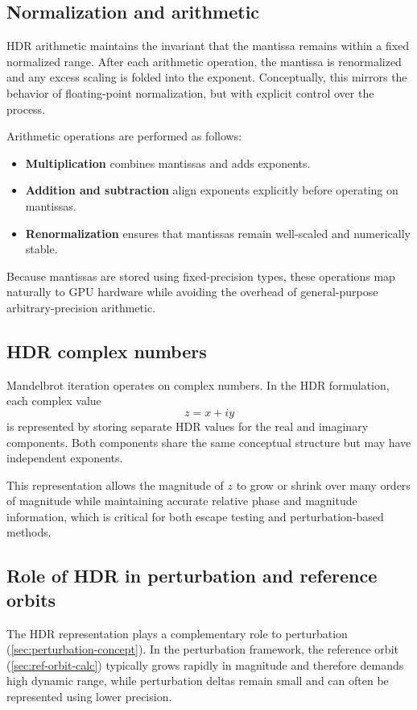 \subsection{Normalization and arithmetic}

HDR arithmetic maintains the invariant that the mantissa remains within a fixed
normalized range. After each arithmetic operation, the mantissa is renormalized
and any excess scaling is folded into the exponent. Conceptually, this mirrors
the behavior of floating-point normalization, but with explicit control over the
process.

Arithmetic operations are performed as follows:
\begin{itemize}
\item \textbf{Multiplication} combines mantissas and adds exponents.
\item \textbf{Addition and subtraction} align exponents explicitly before
      operating on mantissas.
\item \textbf{Renormalization} ensures that mantissas remain well-scaled and
      numerically stable.
\end{itemize}

Because mantissas are stored using fixed-precision types, these operations map
naturally to GPU hardware while avoiding the overhead of general-purpose
arbitrary-precision arithmetic.

\subsection{HDR complex numbers}

Mandelbrot iteration operates on complex numbers. In the HDR formulation, each
complex value
\[
z = x + i y
\]
is represented by storing separate HDR values for the real and imaginary
components. Both components share the same conceptual structure but may have
independent exponents.

This representation allows the magnitude of \(z\) to grow or shrink over many
orders of magnitude while maintaining accurate relative phase and magnitude
information, which is critical for both escape testing and perturbation-based
methods.

\subsection{Role of HDR in perturbation and reference orbits}

The HDR representation plays a complementary role to perturbation (\cref{sec:perturbation-concept}). In the
perturbation framework, the reference orbit (\cref{sec:ref-orbit-calc}) typically grows rapidly in magnitude
and therefore demands high dynamic range, while perturbation deltas remain small
and can often be represented using lower precision.

